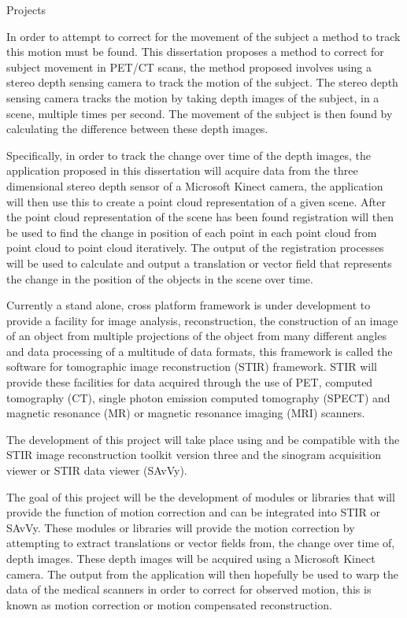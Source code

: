 \documentclass{cv} %
\begin{document}
\begin{rSection}{Projects}
\item In order to attempt to correct for the movement of the subject a method to track this motion must be found. This dissertation proposes a method to correct for subject movement in PET/CT scans, the method proposed involves using a stereo depth sensing camera to track the motion of the subject. The stereo depth sensing camera tracks the motion by taking depth images of the subject, in a scene, multiple times per second. The movement of the subject is then found by calculating the difference between these depth images.

\item Specifically, in order to track the change over time of the depth images, the application proposed in this dissertation will acquire data from the three dimensional stereo depth sensor of a Microsoft Kinect camera, the application will then use this to create a point cloud representation of a given scene. After the point cloud representation of the scene has been found registration will then be used to find the change in position of each point in each point cloud from point cloud to point cloud iteratively. The output of the registration processes will be used to calculate and output a translation or vector field that represents the change in the position of the objects in the scene over time.

\item Currently a stand alone, cross platform framework is under development to provide a facility for image analysis, reconstruction, the construction of an image of an object from multiple projections of the object from many different angles and data processing of a multitude of data formats, this framework is called the software for tomographic image reconstruction (STIR) framework. STIR will provide these facilities for data acquired through the use of PET, computed tomography (CT), single photon emission computed tomography (SPECT) and magnetic resonance (MR) or magnetic resonance imaging (MRI) scanners.

\item The development of this project will take place using and be compatible with the STIR image reconstruction toolkit version three and the sinogram acquisition viewer or STIR data viewer (SAvVy).

\item The goal of this project will be the development of modules or libraries that will provide the function of motion correction and can be integrated into STIR or SAvVy. These modules or libraries will provide the motion correction by attempting to extract translations or vector fields from, the change over time of, depth images. These depth images will be acquired using a Microsoft Kinect camera. The output from the application will then hopefully be used to warp the data of the medical scanners in order to correct for observed motion, this is known as motion correction or motion compensated reconstruction.



\end{rSection}
\end{document}
